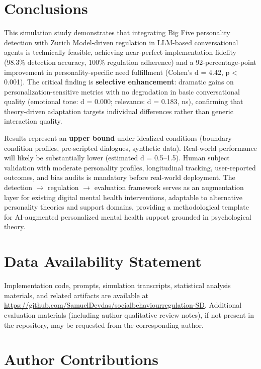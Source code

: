 \documentclass[apajournal,article,submit,moreauthors]{Definitions/mdpi}
\begin{document}
\section{Conclusions}\label{conclusions}

This simulation study demonstrates that integrating Big Five personality detection with Zurich Model-driven regulation in LLM-based conversational agents is technically feasible, achieving near-perfect implementation fidelity (98.3\% detection accuracy, 100\% regulation adherence) and a 92-percentage-point improvement in personality-specific need fulfillment (Cohen's d = 4.42, p \textless{} 0.001). The critical finding is \textbf{selective enhancement}: dramatic gains on personalization-sensitive metrics with no degradation in basic conversational quality (emotional tone: d = 0.000; relevance: d = 0.183, ns), confirming that theory-driven adaptation targets individual differences rather than generic interaction quality.

Results represent an \textbf{upper bound} under idealized conditions (boundary-condition profiles, pre-scripted dialogues, synthetic data). Real-world performance will likely be substantially lower (estimated d = 0.5--1.5). Human subject validation with moderate personality profiles, longitudinal tracking, user-reported outcomes, and bias audits is mandatory before real-world deployment. The detection $\rightarrow$ regulation $\rightarrow$ evaluation framework serves as an augmentation layer for existing digital mental health interventions, adaptable to alternative personality theories and support domains, providing a methodological template for AI-augmented personalized mental health support grounded in psychological theory.

\section{Data Availability Statement}\label{data-availability-statement}

Implementation code, prompts, simulation transcripts, statistical analysis materials, and related artifacts are available at \url{https://github.com/SamuelDevdas/socialbehaviourregulation-SD}. Additional evaluation materials (including author qualitative review notes), if not present in the repository, may be requested from the corresponding author.

\section{Author Contributions}\label{author-contributions}
\end{document}

